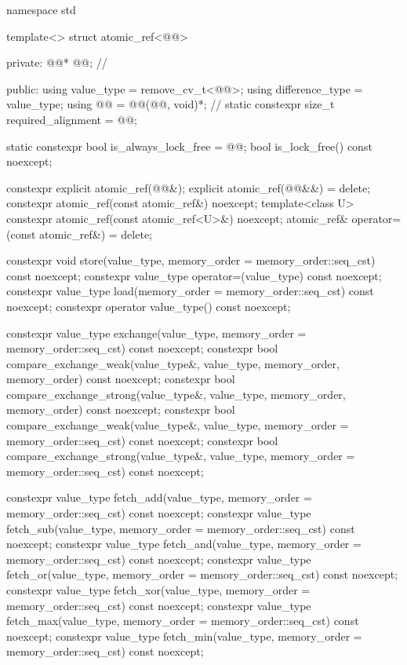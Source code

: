\begin{codeblock}
namespace std {
  template<> struct atomic_ref<@@> {
  private:
    @@* @@;         // \expos

  public:
    using value_type = remove_cv_t<@@>;
    using difference_type = value_type;
    using @@ = @@(@@, void)*;       // \expos
    static constexpr size_t required_alignment = @@;

    static constexpr bool is_always_lock_free = @@;
    bool is_lock_free() const noexcept;

    constexpr explicit atomic_ref(@@&);
    explicit atomic_ref(@@&&) = delete;
    constexpr atomic_ref(const atomic_ref&) noexcept;
    template<class U>
      constexpr atomic_ref(const atomic_ref<U>&) noexcept;
    atomic_ref& operator=(const atomic_ref&) = delete;

    constexpr void store(value_type, memory_order = memory_order::seq_cst) const noexcept;
    constexpr value_type operator=(value_type) const noexcept;
    constexpr value_type load(memory_order = memory_order::seq_cst) const noexcept;
    constexpr operator value_type() const noexcept;

    constexpr value_type exchange(value_type,
                                  memory_order = memory_order::seq_cst) const noexcept;
    constexpr bool compare_exchange_weak(value_type&, value_type,
                                         memory_order, memory_order) const noexcept;
    constexpr bool compare_exchange_strong(value_type&, value_type,
                                           memory_order, memory_order) const noexcept;
    constexpr bool compare_exchange_weak(value_type&, value_type,
                                         memory_order = memory_order::seq_cst) const noexcept;
    constexpr bool compare_exchange_strong(value_type&, value_type,
                                           memory_order = memory_order::seq_cst) const noexcept;

    constexpr value_type fetch_add(value_type,
                                   memory_order = memory_order::seq_cst) const noexcept;
    constexpr value_type fetch_sub(value_type,
                                   memory_order = memory_order::seq_cst) const noexcept;
    constexpr value_type fetch_and(value_type,
                                   memory_order = memory_order::seq_cst) const noexcept;
    constexpr value_type fetch_or(value_type,
                                  memory_order = memory_order::seq_cst) const noexcept;
    constexpr value_type fetch_xor(value_type,
                                   memory_order = memory_order::seq_cst) const noexcept;
    constexpr value_type fetch_max(value_type,
                                   memory_order = memory_order::seq_cst) const noexcept;
    constexpr value_type fetch_min(value_type,
                                   memory_order = memory_order::seq_cst) const noexcept;

}}
\end{codeblock}
